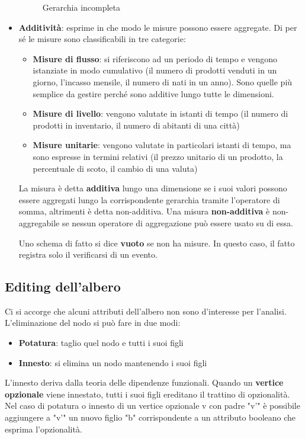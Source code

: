 \begin{itemize}
\begin{figure}[H]
		\caption{Gerarchia incompleta}
		\label{fig:incompleta}
	\end{figure}
	\item 
	\textbf{Additività}: esprime in che modo le misure possono essere aggregate. Di per sé le misure sono classificabili in tre categorie:
	\begin{itemize}
		\item 
		\textbf{Misure di flusso}: si riferiscono ad un periodo di tempo e vengono istanziate in modo cumulativo (il numero di prodotti venduti in un giorno, l’incasso mensile, il numero di nati in un anno). Sono quelle più semplice da gestire perché sono additive lungo tutte le dimensioni.
		\item 
		\textbf{Misure di livello}: vengono valutate in istanti di tempo (il numero di prodotti in inventario, il numero di abitanti di una città)
		\item 
		\textbf{Misure unitarie}: vengono valutate in particolari istanti di tempo, ma sono espresse in termini relativi (il prezzo unitario di un prodotto, la percentuale di scoto, il cambio di una valuta) 
	\end{itemize}
	
	
	La misura è detta \textbf{additiva} lungo una dimensione se i suoi valori possono essere aggregati lungo la corrispondente gerarchia tramite l’operatore di somma, altrimenti è detta non-additiva. Una misura \textbf{non-additiva} è non-aggregabile se nessun operatore di aggregazione può essere usato su di essa.  
	
	Uno schema di fatto si dice \textbf{vuoto} se non ha misure. In questo caso, il fatto registra solo il verificarsi di un evento.
\end{itemize}
	
	\subsection{Editing dell'albero}
	 Ci si accorge che alcuni attributi dell’albero non sono d’interesse per l’analisi. L’eliminazione del nodo si può fare in due modi:
	 \begin{itemize}
	 	\item 
	 	\textbf{Potatura}: taglio quel nodo e tutti i suoi figli
	 	\item 
	 	\textbf{Innesto}: si elimina un nodo mantenendo i suoi figli
	\end{itemize}
	 L’innesto deriva dalla teoria delle dipendenze funzionali. Quando un \textbf{vertice opzionale} viene innestato, tutti i suoi figli ereditano il trattino di opzionalità. Nel caso di potatura o innesto di un vertice opzionale v con padre "v’" è possibile aggiungere a "v’" un nuovo figlio "b" corrispondente a un attributo booleano che esprima l’opzionalità. 
	 
